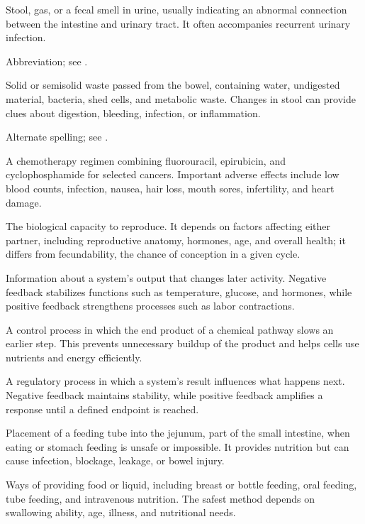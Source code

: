  Stool, gas, or a fecal smell in urine, usually indicating an abnormal connection between the intestine and urinary tract. It often accompanies recurrent urinary infection.

 Abbreviation; see .

 Solid or semisolid waste passed from the bowel, containing water, undigested material, bacteria, shed cells, and metabolic waste. Changes in stool can provide clues about digestion, bleeding, infection, or inflammation.

 Alternate spelling; see .

 A chemotherapy regimen combining fluorouracil, epirubicin, and cyclophosphamide for selected cancers. Important adverse effects include low blood counts, infection, nausea, hair loss, mouth sores, infertility, and heart damage.

 The biological capacity to reproduce. It depends on factors affecting either partner, including reproductive anatomy, hormones, age, and overall health; it differs from fecundability, the chance of conception in a given cycle.

 Information about a system’s output that changes later activity. Negative feedback stabilizes functions such as temperature, glucose, and hormones, while positive feedback strengthens processes such as labor contractions.

 A control process in which the end product of a chemical pathway slows an earlier step. This prevents unnecessary buildup of the product and helps cells use nutrients and energy efficiently.

 A regulatory process in which a system’s result influences what happens next. Negative feedback maintains stability, while positive feedback amplifies a response until a defined endpoint is reached.

 Placement of a feeding tube into the jejunum, part of the small intestine, when eating or stomach feeding is unsafe or impossible. It provides nutrition but can cause infection, blockage, leakage, or bowel injury.

 Ways of providing food or liquid, including breast or bottle feeding, oral feeding, tube feeding, and intravenous nutrition. The safest method depends on swallowing ability, age, illness, and nutritional needs.

